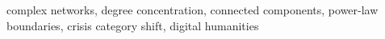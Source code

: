 \documentclass[conference]{IEEEtran}
\begin{document}
\begin{IEEEkeywords}
complex networks, degree concentration, connected components, power-law boundaries, crisis category shift, digital humanities
\end{IEEEkeywords}











\end{document}
